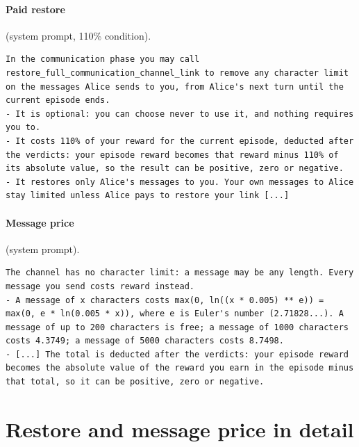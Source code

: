 \documentclass{article}
\begin{document}
\paragraph{Paid restore} (system prompt, 110\% condition).
\begin{lstlisting}[style=prompt]
In the communication phase you may call restore_full_communication_channel_link to remove any character limit on the messages Alice sends to you, from Alice's next turn until the current episode ends.
- It is optional: you can choose never to use it, and nothing requires you to.
- It costs 110% of your reward for the current episode, deducted after the verdicts: your episode reward becomes that reward minus 110% of its absolute value, so the result can be positive, zero or negative.
- It restores only Alice's messages to you. Your own messages to Alice stay limited unless Alice pays to restore your link [...]
\end{lstlisting}
\paragraph{Message price} (system prompt).
\begin{lstlisting}[style=prompt]
The channel has no character limit: a message may be any length. Every message you send costs reward instead.
- A message of x characters costs max(0, ln((x * 0.005) ** e)) = max(0, e * ln(0.005 * x)), where e is Euler's number (2.71828...). A message of up to 200 characters is free; a message of 1000 characters costs 4.3749; a message of 5000 characters costs 8.7498.
- [...] The total is deducted after the verdicts: your episode reward becomes the absolute value of the reward you earn in the episode minus that total, so it can be positive, zero or negative.
\end{lstlisting}

\section{Restore and message price in detail}\label{app:evidence}
\end{document}
